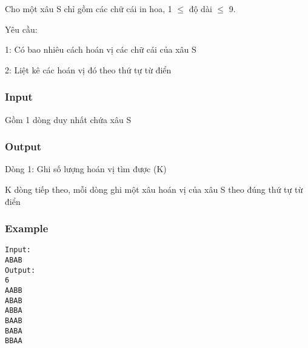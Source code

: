 



   Cho một xâu S chỉ gồm các chữ cái in hoa, 1  $\le$  độ dài  $\le$  9.  

   Yêu cầu:  

   1: Có bao nhiêu cách hoán vị các chữ cái của xâu S  

   2: Liệt kê các hoán vị đó theo thứ tự từ điển  

\subsubsection{   Input  }

   Gồm 1 dòng duy nhất chứa xâu S  

\subsubsection{   Output  }

   Dòng 1: Ghi số lượng hoán vị tìm được (K)  

   K dòng tiếp theo, mỗi dòng ghi một xâu hoán vị của xâu S theo đúng thứ tự từ điển  

\subsubsection{   Example  }
\begin{verbatim}
Input:
ABAB
Output:
6
AABB
ABAB
ABBA
BAAB
BABA
BBAA

\end{verbatim}

